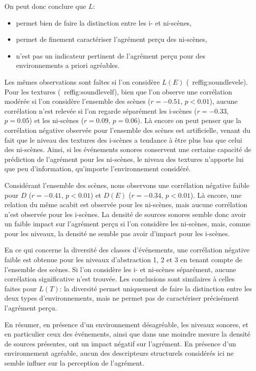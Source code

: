 On peut donc conclure que $L$:

\begin{itemize}
\item permet bien de faire la distinction entre les i- et ni-scènes,
\item permet de finement caractériser l'agrément perçu des ni-scènes,
\item n'est pas un indicateur pertinent de l'agrément perçu pour des environnements a priori agréables.
\end{itemize}

Les mêmes observations sont faîtes si l'on considère $L(E)$ (\cf~ref{fig:soundlevele}). Pour les textures (\cf~ref{fig:soundlevelf}), bien que l'on observe une corrélation modérée si l'on considère l'ensemble des scènes ($r=-0.51$, $p<0.01$), aucune corrélation n'est relevée si l'on regarde séparément les i-scènes ($r=-0.33$, $p=0.05$) et les ni-scènes ($r=0.09$, $p=0.06$). Là encore on peut penser que la corrélation négative observée pour l'ensemble des scènes est artificielle, venant du fait que le niveau des textures des i-scènes a tendance à être plus bas que celui des ni-scènes. Ainsi, si les événements sonores conservent une certaine capacité de prédiction de l'agrément pour les ni-scènes, le niveau des textures n'apporte lui que peu d'information, qu'importe l'environnement considéré.

Considérant l'ensemble des scènes, nous observons une corrélation négative faible pour $D$ ($r=-0.41$, $p<0.01$) et $D(E)$ ($r=-0.34$, $p<0.01$). Là encore, une relation du même acabit est observée pour les ni-scènes, mais aucune corrélation n'est observée pour les i-scènes. La densité de sources sonores semble donc avoir un faible impact sur l'agrément perçu si l'on considère les ni-scènes, mais, comme pour les niveaux, la densité ne semble pas avoir d'impact pour les i-scènes.

En ce qui concerne la diversité des classes d'événements, une corrélation négative faible est obtenue pour les niveaux d'abstraction 1, 2 et 3 en tenant compte de l'ensemble des scènes. Si l'on considère les i- et ni-scènes séparément, aucune corrélation significative n'est trouvée. Les conclusions sont similaires à celles faites pour $L(T)$: la diversité permet uniquement de faire la distinction entre les deux types d'environnements, mais ne permet pas de caractériser précisément l'agrément perçu.

En résumer, en présence d'un environnement désagréable, les niveaux sonores, et en particulier ceux des événements, ainsi que dans une moindre mesure la densité de sources présentes, ont un impact négatif sur l'agrément. En présence d'un environnement agréable, aucun des descripteurs structurels considérés ici ne semble influer sur la perception de l'agrément. 

